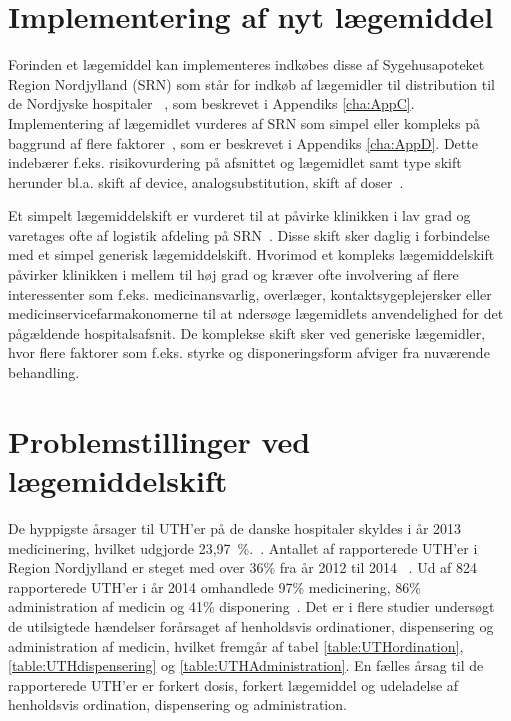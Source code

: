 \section{Implementering af nyt lægemiddel}
Forinden et lægemiddel kan implementeres indkøbes disse af Sygehusapoteket Region Nordjylland (SRN) som står for indkøb af lægemidler til distribution til de Nordjyske hospitaler ~\citep{SygehusapoteketRegionNordjylland2013}, som beskrevet i Appendiks \ref{cha:AppC}. Implementering af lægemidlet vurderes af SRN som simpel eller kompleks på baggrund af flere faktorer~\citep{Sygehusapoteket2017}, som er beskrevet i Appendiks \ref{cha:AppD}. Dette indebærer f.eks. risikovurdering på afsnittet og lægemidlet samt type skift herunder bl.a. skift af device, analogsubstitution, skift af doser~\citep{Sygehusapoteket2017}. 

Et simpelt lægemiddelskift er vurderet til at påvirke klinikken i lav grad og varetages ofte af logistik afdeling på SRN~\citep{Laegemiddelinformaion2017, Sygehusapoteket2017a}. Disse skift sker daglig i forbindelse med et simpel generisk lægemiddelskift. Hvorimod et kompleks lægemiddelskift påvirker klinikken i mellem til høj grad og kræver ofte involvering af flere interessenter som f.eks. medicinansvarlig, overlæger, kontaktsygeplejersker eller medicinservicefarmakonomerne til at ndersøge lægemidlets anvendelighed for det pågældende hospitalsafsnit. 
De komplekse skift sker ved generiske lægemidler, hvor flere faktorer som f.eks. styrke og disponeringsform afviger fra nuværende behandling.~\citep{Laegemiddelinformaion2017,Sygehusapoteket2017a}

\section{Problemstillinger ved lægemiddelskift}
De hyppigste årsager til UTH'er på de danske hospitaler skyldes i år 2013 medicinering, hvilket udgjorde 23,97~\%.~\citep{Patientombuddet2013}. Antallet af rapporterede UTH'er i Region Nordjylland er steget med over 36\% fra år 2012 til 2014 ~\citep{Jensen2014}. Ud af 824 rapporterede UTH'er i år 2014 omhandlede 97\% medicinering, 86\% administration af medicin og 41\% disponering~\citep{Jensen2014}. Det er i flere studier undersøgt de utilsigtede hændelser forårsaget af henholdsvis ordinationer, dispensering og administration af medicin, hvilket fremgår af tabel \ref{table:UTHordination}, \ref{table:UTHdispensering} og \ref{table:UTHAdministration}. En fælles årsag til de rapporterede UTH'er er forkert dosis, forkert lægemiddel og udeladelse af henholdsvis ordination, dispensering og administration.

